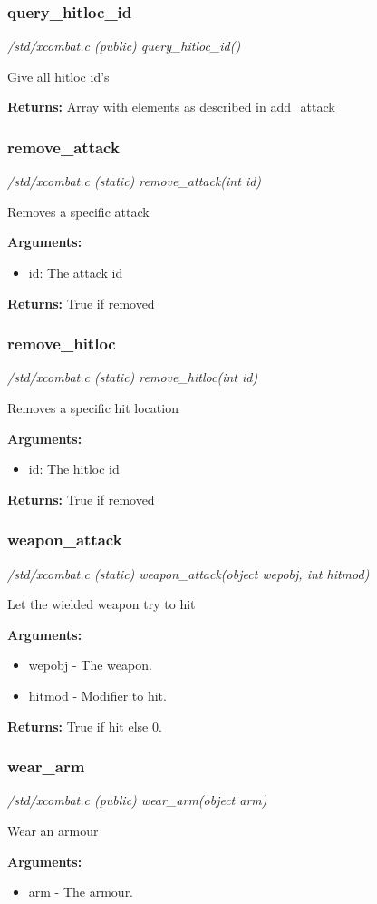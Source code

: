 \subsubsection{query\_hitloc\_id}

{\em /std/xcombat.c (public) query\_hitloc\_id()}

Give all hitloc id's

{\bf Returns:}        Array with elements as described in add\_attack


\subsubsection{remove\_attack}

{\em /std/xcombat.c (static) remove\_attack(int id)}

Removes a specific attack

{\bf Arguments:}
\begin{itemize}
\item      id: The attack id
\end{itemize}

{\bf Returns:}        True if removed


\subsubsection{remove\_hitloc}

{\em /std/xcombat.c (static) remove\_hitloc(int id)}

Removes a specific hit location

{\bf Arguments:}
\begin{itemize}
\item      id: The hitloc id
\end{itemize}

{\bf Returns:}        True if removed


\subsubsection{weapon\_attack}

{\em /std/xcombat.c (static) weapon\_attack(object wepobj, int hitmod)}

Let the wielded weapon try to hit

{\bf Arguments:}
\begin{itemize}
\item      wepobj - The weapon.
\item hitmod - Modifier to hit.
\end{itemize}

{\bf Returns:}        True if hit else 0.


\subsubsection{wear\_arm}

{\em /std/xcombat.c (public) wear\_arm(object arm)}

Wear an armour

{\bf Arguments:}
\begin{itemize}
\item     arm - The armour.
\end{itemize}
